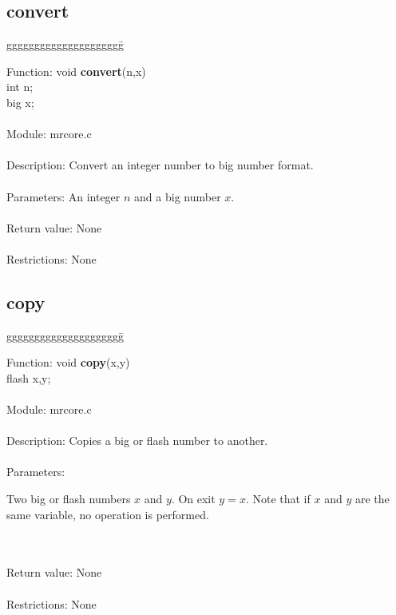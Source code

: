 \subsection{convert}

\begin{tabbing}
ggggggggggggggggggggg\= \kill


      Function:      \>void {\bf convert}(n,x)  \\
                     \>int n;                   \\
                     \>big x;                   \\
      \ \\
      Module:        \>mrcore.c \\
      \ \\
      Description:   \>Convert an integer number to big number format. \\
      \ \\
      Parameters:    \>An integer $n$ and a big number $x$.  \\
      \ \\
      Return value:  \>None \\
      \ \\
      Restrictions:  \>None \\

\end{tabbing}

\subsection{copy}

\begin{tabbing}
ggggggggggggggggggggg\= \kill

      Function:      \>void {\bf copy}(x,y)   \\
                     \>flash x,y;\\
      \ \\
      Module:        \>mrcore.c  \\
      \ \\
      Description:   \>Copies a big or flash number to another. \\
      \ \\
      Parameters:    \>
                     \parbox[t]{3in}
                     {Two big or flash numbers $x$ and $y$. On exit $y=x$. 
                     Note that if $x$ and $y$ are the same variable, no 
                     operation is performed.} \\
      \ \\
      Return value:  \>None  \\
      \ \\
      Restrictions:  \>None   \\

\end{tabbing}

